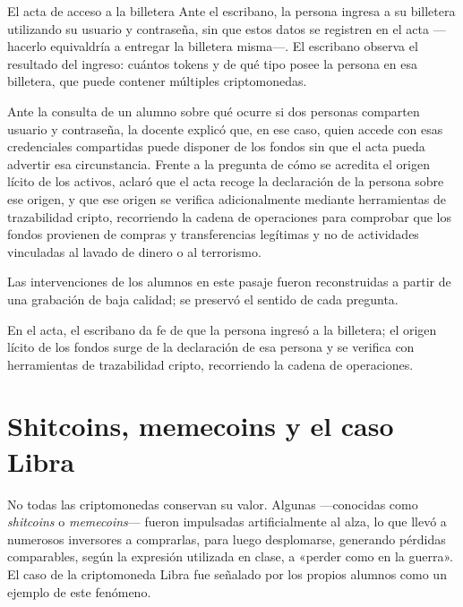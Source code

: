 \documentclass[12pt,oneside]{book}
\begin{document}
\begin{example}{El acta de acceso a la billetera}
Ante el escribano, la persona ingresa a su billetera utilizando su usuario y contraseña, sin que estos datos se registren en el acta —hacerlo equivaldría a entregar la billetera misma—. El escribano observa el resultado del ingreso: cuántos tokens y de qué tipo posee la persona en esa billetera, que puede contener múltiples criptomonedas.
\end{example}

Ante la consulta de un alumno sobre qué ocurre si dos personas comparten usuario y contraseña, la docente explicó que, en ese caso, quien accede con esas credenciales compartidas puede disponer de los fondos sin que el acta pueda advertir esa circunstancia. Frente a la pregunta de cómo se acredita el origen lícito de los activos, aclaró que el acta recoge la declaración de la persona sobre ese origen, y que ese origen se verifica adicionalmente mediante herramientas de trazabilidad cripto, recorriendo la cadena de operaciones para comprobar que los fondos provienen de compras y transferencias legítimas y no de actividades vinculadas al lavado de dinero o al terrorismo.

\begin{note}
Las intervenciones de los alumnos en este pasaje fueron reconstruidas a partir de una grabación de baja calidad; se preservó el sentido de cada pregunta.
\end{note}

\begin{important}
En el acta, el escribano da fe de que la persona ingresó a la billetera; el origen lícito de los fondos surge de la declaración de esa persona y se verifica con herramientas de trazabilidad cripto, recorriendo la cadena de operaciones.
\end{important}

\section{Shitcoins, memecoins y el caso Libra}

No todas las criptomonedas conservan su valor. Algunas —conocidas como \textit{shitcoins} o \textit{memecoins}— fueron impulsadas artificialmente al alza, lo que llevó a numerosos inversores a comprarlas, para luego desplomarse, generando pérdidas comparables, según la expresión utilizada en clase, a «perder como en la guerra». El caso de la criptomoneda Libra fue señalado por los propios alumnos como un ejemplo de este fenómeno.
\end{document}
